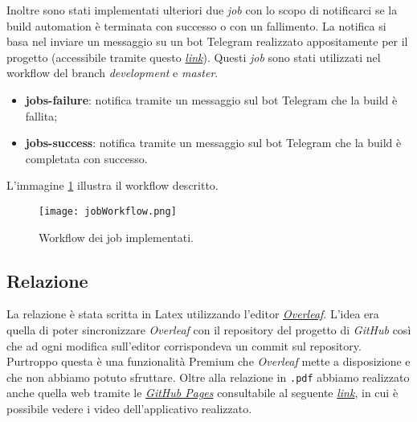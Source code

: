Inoltre sono stati implementati ulteriori due \textit{job} con lo scopo di notificarci se la build automation è terminata con successo o con un fallimento. La notifica si basa nel inviare un messaggio su un bot Telegram realizzato appositamente per il progetto (accessibile tramite questo \href{https://telegram.me/AzureHealthcareNotificator_bot}{\textit{link}}). Questi \textit{job} sono stati utilizzati nel workflow del branch \textit{development} e \textit{master}.
\begin{itemize}
    \item \textbf{jobs-failure}: notifica tramite un messaggio sul bot Telegram che la build è fallita;  
    
    \item \textbf{jobs-success}: notifica tramite un messaggio sul bot Telegram che la build è completata con successo.  
\end{itemize}

L'immagine \ref{pic:job-workflow} illustra il workflow descritto.

\begin{figure}[ht]
    \texttt{[image: jobWorkflow.png]}
    \centering
    \caption{\label{pic:job-workflow}Workflow dei job implementati.}
\end{figure}

\subsection{Relazione}
La relazione è stata scritta in Latex utilizzando l'editor  \href{https://it.overleaf.com/}{\textit{Overleaf}}. L'idea era quella di poter sincronizzare \textit{Overleaf} con il repository del progetto di \textit{GitHub} così che ad ogni modifica sull'editor corrispondeva un commit sul repository. Purtroppo questa è una funzionalità Premium che \textit{Overleaf} mette a disposizione e che non abbiamo potuto sfruttare. Oltre alla relazione in \texttt{.pdf} abbiamo realizzato anche quella web tramite le \href{https://pages.github.com/}{\textit{GitHub Pages}} consultabile al seguente \href{https://lucagiorgettismp.github.io/AzureHealthcareDigitalTwins/}{\textit{link}}, in cui è possibile vedere i video dell'applicativo realizzato.

